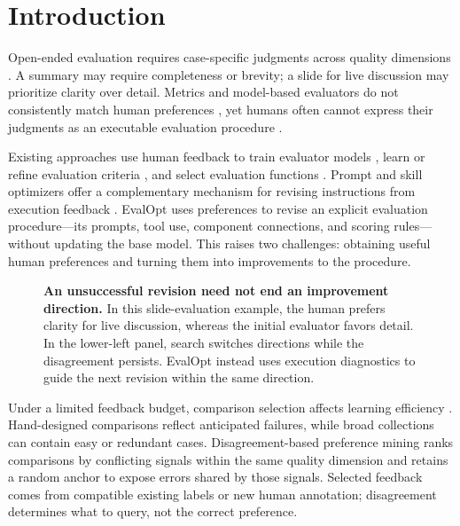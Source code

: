 \section{Introduction}
\label{sec:intro}

Open-ended evaluation requires case-specific judgments across quality dimensions \citep{ye2024flask,kim2024evallm}.
A summary may require completeness or brevity; a slide for live discussion may prioritize clarity over detail.
Metrics and model-based evaluators do not consistently match human preferences \citep{fabbri2021summeval,xu2023imagereward,zheng2023judging,hu2024criteria}, yet humans often cannot express their judgments as an executable evaluation procedure \citep{shankar2024evalgen}.

Existing approaches use human feedback to train evaluator models \citep{xu2023imagereward}, learn or refine evaluation criteria \citep{liu2024autocalibrate,lv2026queryrubrics}, and select evaluation functions \citep{shankar2024evalgen}.
Prompt and skill optimizers offer a complementary mechanism for revising instructions from execution feedback \citep{agrawal2026gepa,yang2026skillopt}.
EvalOpt uses preferences to revise an explicit evaluation procedure---its prompts, tool use, component connections, and scoring rules---without updating the base model.
This raises two challenges: obtaining useful human preferences and turning them into improvements to the procedure.

\begin{figure}[t]
\centering

\caption{\textbf{An unsuccessful revision need not end an improvement direction.}
In this slide-evaluation example, the human prefers clarity for live discussion, whereas the initial evaluator favors detail.
In the lower-left panel, search switches directions while the disagreement persists.
EvalOpt instead uses execution diagnostics to guide the next revision within the same direction.}
\label{fig:teaser}
\end{figure}

Under a limited feedback budget, comparison selection affects learning efficiency \citep{muldrew2024activepreference,oh2025activepreference}.
Hand-designed comparisons reflect anticipated failures, while broad collections can contain easy or redundant cases.
Disagreement-based preference mining ranks comparisons by conflicting signals within the same quality dimension and retains a random anchor to expose errors shared by those signals.
Selected feedback comes from compatible existing labels or new human annotation; disagreement determines what to query, not the correct preference.

